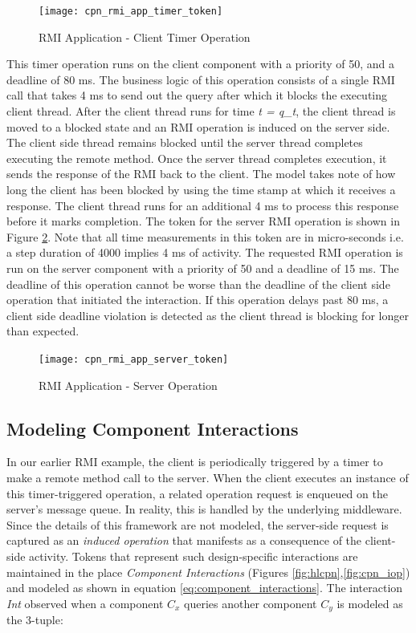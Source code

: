 \begin{figure}[ht]
	\centering
	\texttt{[image: cpn\_rmi\_app\_timer\_token]}
	\caption{RMI Application - Client Timer Operation}
	\label{fig:cpn_rmi_app_timer_token}
\end{figure}

This timer operation runs on the client component with a priority of 50, and a deadline of 80 ms. The business logic of this operation consists of a single RMI call that takes 4 ms to send out the query after which it blocks the executing client thread. After the client thread runs for time \emph{t = q\_t}, the client thread is moved to a blocked state and an RMI operation is induced on the server side. The client side thread remains blocked until the server thread completes executing the remote method. Once the server thread completes execution, it sends the response of the RMI back to the client. The model takes note of how long the client has been blocked by using the time stamp at which it receives a response. The client thread runs for an additional 4 ms to process this response before it marks completion. The token for the server RMI operation is shown in Figure \ref{fig:cpn_rmi_app_server_token}. Note that all time measurements in this token are in micro-seconds i.e. a step duration of 4000 implies 4 ms of activity. The requested RMI operation is run on the server component with a priority of 50 and a deadline of 15 ms. The deadline of this operation cannot be worse than the deadline of the client side operation that initiated the interaction. If this operation delays past 80 ms, a client side deadline violation is detected as the client thread is blocking for longer than expected. 

\begin{figure}[ht]
	\centering
	\texttt{[image: cpn\_rmi\_app\_server\_token]}
	\caption{RMI Application - Server Operation}
	\label{fig:cpn_rmi_app_server_token}
\end{figure}


\subsection{Modeling Component Interactions}
\label{sec:operation_induction}

In our earlier RMI example, the client is periodically triggered by a timer to make a remote method call to the server. When the client executes an instance of this timer-triggered operation, a related operation request is enqueued on the server's message queue. In reality, this is handled by the underlying middleware. Since the details of this framework are not modeled, the server-side request is captured as an \emph{induced operation} that manifests as a consequence of the client-side activity. Tokens that represent such design-specific interactions are maintained in the place \emph{Component Interactions} (Figures \ref{fig:hlcpn},\ref{fig:cpn_iop}) and modeled as shown in equation \ref{eq:component_interactions}. The interaction \emph{Int} observed when a component $C_x$ queries another component $C_y$ is modeled as the 3-tuple:

